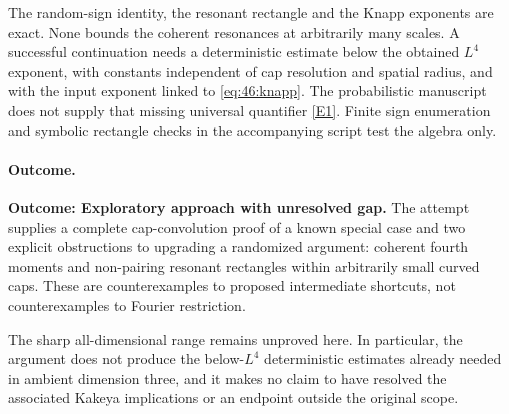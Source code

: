 \documentclass[11pt,a4paper]{article}
\newcommand{\eref}[2]{\hyperlink{extra:#1:#2}{[E#2]}}
\numberwithin{equation}{section}
\begin{document}
The random-sign identity, the resonant rectangle and the Knapp exponents
are exact. None bounds the coherent resonances at arbitrarily many scales.
A successful continuation needs a deterministic estimate below the obtained
$L^4$ exponent, with constants independent of cap resolution and spatial
radius, and with the input exponent linked to \eqref{eq:46:knapp}. The
probabilistic manuscript does not supply that missing universal quantifier
\eref{46}{1}. Finite sign enumeration and symbolic rectangle checks in the
accompanying script test the algebra only.

\paragraph{Outcome.}
\textbf{Outcome: Exploratory approach with unresolved gap.}
The attempt supplies a complete cap-convolution proof of a known special
case and two explicit obstructions to upgrading a randomized argument:
coherent fourth moments and non-pairing resonant rectangles within arbitrarily
small curved caps. These are counterexamples to proposed intermediate
shortcuts, not counterexamples to Fourier restriction.

The sharp all-dimensional range remains unproved here. In particular,
the argument does not produce the below-$L^4$ deterministic estimates already
needed in ambient dimension three, and it makes no claim to have resolved
the associated Kakeya implications or an endpoint outside the original scope.
\end{document}
